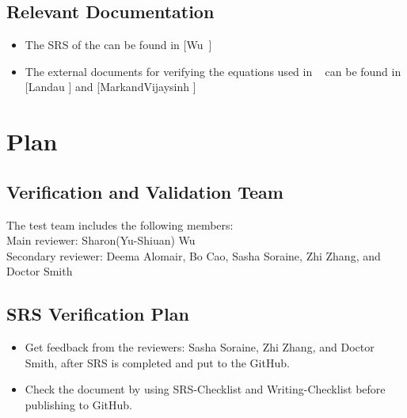 \documentclass[12pt, titlepage]{article}
\begin{document}

\subsection{Relevant Documentation}\label{RD}

\begin{itemize} 
\item[ ]The SRS of the \progname can be found in [Wu~\cite{YS2019}] 
\item[ ]The external documents for verifying the equations used in \progname~
can be found in [Landau \cite{Charles2001} ] and
[MarkandVijaysinh\cite{JacobsonandJadhav} ]

 \end{itemize} 

 \section{Plan}	
\subsection{Verification and Validation Team} The test team includes the
following members:\\ 
Main reviewer: Sharon(Yu-Shiuan) Wu\\ 
Secondary reviewer: Deema Alomair, Bo Cao, Sasha Soraine, Zhi Zhang, 
and Doctor Smith\\
\subsection{SRS Verification Plan}

\begin{itemize}

\item Get feedback from the reviewers: Sasha Soraine, Zhi Zhang, and Doctor
Smith, after SRS is completed and put to the GitHub.
\item Check the document by using SRS-Checklist and Writing-Checklist before
publishing to GitHub.

\end{itemize}
\end{document}
